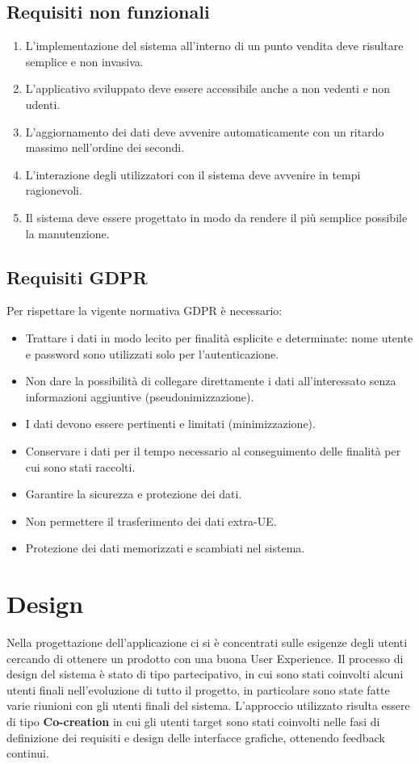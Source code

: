 \documentclass[italian]{report}
\begin{document}
\section{Requisiti non funzionali}
\begin{enumerate}
    \item L’implementazione del sistema all’interno di un punto vendita deve risultare semplice e non invasiva.
    \item L'applicativo sviluppato deve essere accessibile anche a non vedenti e non udenti.
    \item L'aggiornamento dei dati deve avvenire automaticamente con un ritardo massimo nell'ordine dei secondi.
    \item L’interazione degli utilizzatori con il sistema deve avvenire in tempi ragionevoli.
    \item Il sistema deve essere progettato in modo da rendere il più semplice possibile la manutenzione.
\end{enumerate}
\section{Requisiti GDPR}
Per rispettare la vigente normativa GDPR è necessario:
\begin{itemize}
    \item Trattare i dati in modo lecito per finalità esplicite e determinate: nome utente e password sono utilizzati solo per l’autenticazione.
    \item Non dare la possibilità di collegare direttamente i dati all’interessato senza informazioni aggiuntive (pseudonimizzazione).
    \item I dati devono essere pertinenti e limitati (minimizzazione).
    \item Conservare i dati per il tempo necessario al conseguimento delle finalità per cui sono stati raccolti.
    \item Garantire la sicurezza e protezione dei dati.
    \item Non permettere il trasferimento dei dati extra-UE.
    \item Protezione dei dati memorizzati e scambiati nel sistema.
\end{itemize}
\chapter{Design}
Nella progettazione dell'applicazione ci si è concentrati sulle esigenze degli utenti cercando di ottenere un prodotto con una buona User Experience.
Il processo di design del sistema è stato di tipo partecipativo, in cui sono stati coinvolti alcuni utenti finali nell'evoluzione di tutto il progetto, in particolare sono state fatte varie riunioni con gli utenti finali del sistema. L'approccio utilizzato risulta essere di tipo \textbf{Co-creation} in cui gli utenti target sono stati coinvolti nelle fasi di definizione dei requisiti e design delle interfacce grafiche, ottenendo feedback continui.
\end{document}
